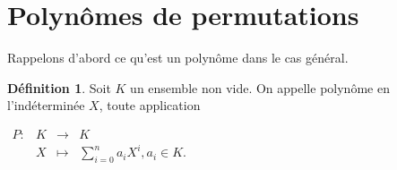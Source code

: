 \documentclass[12pt]{article}
\theoremstyle{definition}
\newtheorem{definition}{Définition}
\begin{document}
\section{Polynômes de permutations}
Rappelons d'abord ce qu'est un polynôme dans le cas général.\\ %
\begin{definition} %
Soit $K$ un ensemble non vide. On appelle polynôme en l'indéterminée $X$, toute application
\begin{center}
$
\begin{array}{l|rcl}
\displaystyle
P : & K & \longrightarrow & K \\
    & X & \longmapsto & \sum_{i=0}^n a_iX^i,  a_i \in K.
\end{array}
$
\end{center}
\end{definition}
\end{document}
